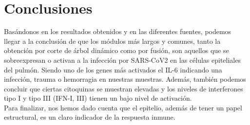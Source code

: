 \newpage
\section{Conclusiones}

\noindent Basándonos en los resultados obtenidos y en las diferentes fuentes,  podemos llegar a la conclusión de que los módulos más largos y comunes, tanto la obtención por corte de árbol dinámico como por fusión, son aquellos que se sobreexpresan o activan a la infección por SARS-CoV2 en las células epiteliales del pulmón. Siendo uno de los genes más activados el IL-6 indicando una infección, trauma o hemorragia en nuestras muestras. Además, también podemos concluir que ciertas citoquinas se muestran elevadas y los niveles de interferones tipo I y tipo III (IFN-I, III) tienen un bajo nivel de activación. \\

\noindent Para finalizar, nos hemos dado cuenta que el epitelio, además de tener un papel estructural, es un claro indicador de la respuesta inmune.